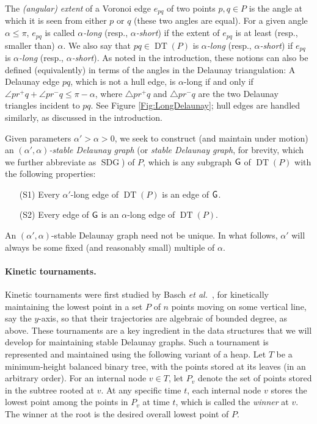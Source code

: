 \documentclass[letter,11pt]{article}
\def\G{{\sf G}}
\def\SDG{\mathop{\mathrm{SDG}}}
\def\DT{\mathop{\mathrm{DT}}}
\begin{document}
The {\em (angular) extent} of a Voronoi edge $e_{pq}$ of two points 
$p,q\in P$ is
the angle at which it is seen from either $p$ or $q$ (these two
angles are equal).  For a given angle $\alpha \le \pi$, 
$e_{pq}$  is  called {\em $\alpha$-long} (resp., {\em
$\alpha$-short}) if the extent of $e_{pq}$ is at least
 (resp., smaller than) $\alpha$. We also say that
$pq \in \DT(P)$ is {\em $\alpha$-long} (resp., {\em
$\alpha$-short}) if $e_{pq}$ is {\em $\alpha$-long} (resp., {\em
$\alpha$-short}). As noted in the introduction, these notions can also be defined (equivalently) in terms of the angles in the Delaunay triangulation: A Delaunay edge $pq$, which is not a hull edge, is $\alpha$-long if and only if $\angle pr^+q+\angle pr^-q\leq \pi-\alpha$,
where $\triangle pr^+q$ and $\triangle pr^-q$ are the two Delaunay triangles incident to $pq$. See Figure \ref{Fig:LongDelaunay}; hull edges are handled similarly, as discussed in the introduction.


Given parameters $\alpha'>\alpha>0$, we seek to construct (and
maintain under motion) an \emph{$(\alpha',\alpha)$-stable Delaunay
graph} (or \emph{stable Delaunay graph}, for brevity, which we further abbreviate as $\SDG$) of $P$, which
is any subgraph $\G$ of $\DT(P)$ with the following properties:
\begin{itemize}
\item[(S1)]
  Every $\alpha'$-long edge of $\DT(P)$ is an edge of
  $\G$.
\item[(S2)]
  Every edge of $\G$ is an $\alpha$-long edge of $\DT(P)$.
\end{itemize}
An $(\alpha',\alpha)$-stable Delaunay graph need not be
unique. In what follows, $\alpha'$ will always be some fixed (and reasonably small) multiple of $\alpha$.

\paragraph{Kinetic tournaments.} 
Kinetic tournaments were first studied by
Basch \textit{et al.}~\cite{bgh-dsmd-99}, for kinetically maintaining the lowest point in a set $P$ of $n$ points moving on some vertical line, say the $y$-axis, so that their trajectories are algebraic of bounded degree, as above. 
These tournaments are a key ingredient in the data structures that we will develop for maintaining stable Delaunay graphs. Such a tournament is 
represented and maintained using the following variant of a heap.
Let $T$ be a minimum-height balanced binary tree, with the points stored
at its leaves (in an arbitrary order). For an internal node $v\in T$,
let $P_v$ denote the set of points stored in the subtree rooted at $v$. At any
specific time $t$, each internal node $v$ stores the lowest point
among the points in $P_v$ at time $t$, which is called the {\em winner\/} at $v$.
The winner at the root is the desired overall lowest point of $P$.
\end{document}
